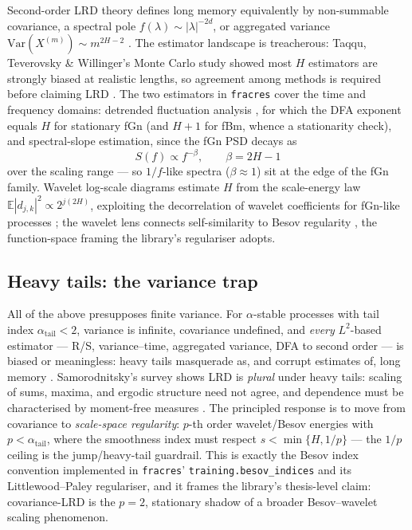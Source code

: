 \documentclass[11pt,a4paper]{article}
\begin{document}
Second-order LRD theory defines long memory equivalently by non-summable
covariance, a spectral pole $f(\lambda) \sim |\lambda|^{-2d}$, or aggregated
variance $\mathrm{Var}(X^{(m)}) \sim m^{2H-2}$ \cite{beran1994statistics}.
The estimator landscape is treacherous: Taqqu, Teverovsky \& Willinger's
Monte Carlo study showed most $H$ estimators are strongly biased at realistic
lengths, so agreement among methods is required before claiming LRD
\cite{taqqu1995estimators}. The two estimators in \texttt{fracres} cover the
time and frequency domains: detrended fluctuation analysis
\cite{peng1994mosaic}, for which the DFA exponent equals $H$ for stationary
fGn (and $H+1$ for fBm, whence a stationarity check), and spectral-slope
estimation, since the fGn PSD decays as
\begin{equation}
  S(f) \propto f^{-\beta}, \qquad \beta = 2H - 1
  \label{eq:psd}
\end{equation}
over the scaling range --- so $1/f$-like spectra ($\beta \approx 1$) sit at
the edge of the fGn family. Wavelet log-scale diagrams estimate $H$ from the
scale-energy law $\mathbb{E}|d_{j,k}|^2 \propto 2^{j(2H)}$, exploiting the
decorrelation of wavelet coefficients for fGn-like processes
\cite{abry1998wavelet,veitch1999wavelet}; the wavelet lens connects
self-similarity to Besov regularity \cite{abry2003self}, the function-space
framing the library's regulariser adopts.

\subsection{Heavy tails: the variance trap}

All of the above presupposes finite variance. For $\alpha$-stable processes
with tail index $\alpha_{\mathrm{tail}} < 2$, variance is infinite,
covariance undefined, and \emph{every} $L^2$-based estimator --- R/S,
variance--time, aggregated variance, DFA to second order --- is biased or
meaningless: heavy tails masquerade as, and corrupt estimates of, long memory
\cite{samorodnitsky1994stable,samorodnitsky2007long}. Samorodnitsky's survey
shows LRD is \emph{plural} under heavy tails: scaling of sums, maxima, and
ergodic structure need not agree, and dependence must be characterised by
moment-free measures \cite{samorodnitsky2007long}. The principled response is
to move from covariance to \emph{scale-space regularity}: $p$-th order
wavelet/Besov energies with $p < \alpha_{\mathrm{tail}}$, where the
smoothness index must respect $s < \min\{H, 1/p\}$ --- the $1/p$ ceiling is
the jump/heavy-tail guardrail. This is exactly the Besov index convention
implemented in \texttt{fracres}' \texttt{training.besov\_indices} and its
Littlewood--Paley regulariser, and it frames the library's thesis-level
claim: covariance-LRD is the $p=2$, stationary shadow of a broader
Besov--wavelet scaling phenomenon.
\end{document}
